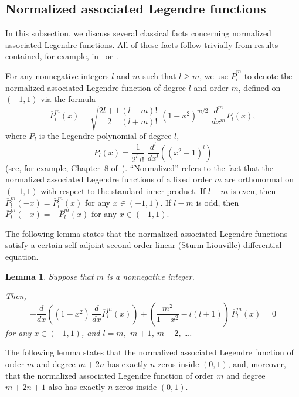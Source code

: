 \documentclass[final,3p,times]{elsarticle}
\newtheorem{lemma1}[theorem]{Lemma}
\newenvironment{lemma}{\begin{lemma1}}{\end{lemma1}}
\begin{document}
\subsection{Normalized associated Legendre functions}
\label{basic}


In this subsection, we discuss several classical facts concerning
normalized associated Legendre functions.
All of these facts follow trivially from results contained,
for example, in~\cite{abramowitz-stegun} or~\cite{szego}.


For any nonnegative integers $l$ and $m$ such that $l \ge m$,
we use $\overline{P}_l^m$ to denote the normalized associated Legendre function
of degree $l$ and order $m$, defined on $(-1,1)$ via the formula
\begin{equation}
\label{association}
\overline{P}^m_l(x) = \sqrt{\frac{2l+1}{2} \frac{(l-m)!}{(l+m)!}}
                   \; \left(1-x^2\right)^{m/2} \; \frac{d^m}{dx^m}P_l(x),
\end{equation}
where $P_l$ is the Legendre polynomial of degree $l$,
\begin{equation}
P_l(x) = \frac{1}{2^l \, l!} \; \frac{d^l}{dx^l}\left((x^2-1)^l\right)
\end{equation}
(see, for example, Chapter~8 of~\cite{abramowitz-stegun}).
``Normalized'' refers to the fact that
the normalized associated Legendre functions
of a fixed order $m$ are orthonormal on $(-1,1)$
with respect to the standard inner product.
If $l-m$ is even, then $\overline{P}^m_l(-x) = \overline{P}^m_l(x)$
for any $x \in (-1,1)$.
If $l-m$ is odd, then $\overline{P}^m_l(-x) = -\overline{P}^m_l(x)$
for any $x \in (-1,1)$.


The following lemma states that the normalized associated Legendre functions
satisfy a certain self-adjoint second-order linear (Sturm-Liouville)
differential equation.

\begin{lemma}
Suppose that $m$ is a nonnegative integer.

Then,
\begin{equation}
\label{sturm-liouville_Leg}
-\frac{d}{dx}\left( (1-x^2) \, \frac{d}{dx}\overline{P}^m_l(x) \right)
+\left( \frac{m^2}{1-x^2} - l(l+1) \right) \, \overline{P}^m_l(x) = 0
\end{equation}
for any $x \in (-1,1)$, and $l = m$,~$m+1$, $m+2$, \dots.
\end{lemma}


The following lemma states that the normalized associated Legendre function
of order $m$ and degree $m+2n$ has exactly $n$ zeros inside $(0,1)$,
and, moreover, that the normalized associated Legendre function
of order $m$ and degree $m+2n+1$ also has exactly $n$ zeros inside $(0,1)$.
\end{document}
